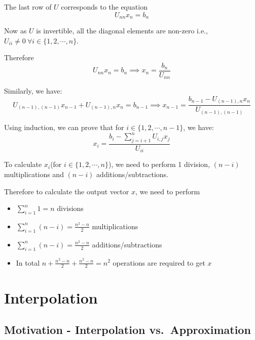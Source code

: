 \documentclass[
]{book}
\begin{document}
The last row of \(U\) corresponds to the equation
\begin{equation}
U_{nn} x_n = b_n
\end{equation}

Now as \(U\) is invertible, all the diagonal elements are non-zero i.e., \(U_{ii}\neq 0 \ \forall i \in\{1,2,\cdots , n\}\).

Therefore
\begin{equation}
U_{nn} x_n = b_n \implies x_n = \frac{b_n}{U_{nn}}
\end{equation}

Similarly, we have:
\begin{equation}
U_{(n-1),(n-1)}x_{n-1}+U_{(n-1),n}x_n = b_{n-1} \implies x_{n-1} = \frac{b_{n-1}-U_{(n-1),n}x_n}{U_{(n-1),(n-1)}}
\end{equation}

Using induction, we can prove that for \(i \in \{1,2,\cdots,n-1\}\), we have:
\begin{equation}
x_i = \frac{b_i -\sum_{j=i+1}^n U_{i,j}x_j}{U_{ii}}
\end{equation}

To calculate \(x_i\)(for \(i \in \{1,2,\cdots,n\}\)), we need to perform 1 division, \((n-i)\) multiplications and \((n-i)\) additions/subtractions.

Therefore to calculate the output vector \(x\), we need to perform

\begin{itemize}
\item
  \(\sum_{i=1}^n 1 = n\) divisions
\item
  \(\sum_{i=1}^n (n-i) = \frac{n^2-n}{2}\) multiplications
\item
  \(\sum_{i=1}^n (n-i) = \frac{n^2-n}{2}\) additions/subtractions
\item
  In total \(n+ \frac{n^2-n}{2}+\frac{n^2-n}{2} = n^2\) operations are required to get \(x\)
\end{itemize}

\hypertarget{interpolation}{%
\chapter{Interpolation}\label{interpolation}}

\hypertarget{motivation---interpolation-vs.-approximation}{%
\section{Motivation - Interpolation vs.~Approximation}\label{motivation---interpolation-vs.-approximation}}
\end{document}
